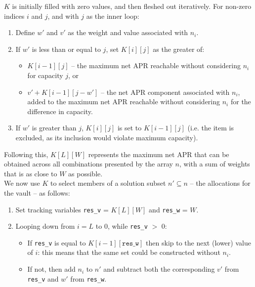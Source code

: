\documentclass{article}
\begin{document}
\noindent
$K$ is initially filled with zero values, and then fleshed out iteratively. For non-zero indices $i$ and $j$, and with $j$ as the inner loop:

\begin{enumerate}
    \item Define $w'$ and $v'$ as the weight and value associated with $n_i$.
    \item If $w'$ is less than or equal to $j$, set $K[i][j]$ as the greater of:
    \begin{itemize}
        \item $K[i - 1][j]$ -- the maximum net APR reachable without considering $n_i$ for capacity $j$, or
        \item $v' + K[i - 1][j - w']$ -- the net APR component associated with $n_i$, added to the maximum net APR reachable without considering $n_i$ for the difference in capacity.
    \end{itemize}
    \item If $w'$ is greater than $j$, $K[i][j]$ is set to $K[i - 1][j]$ (i.e. the item is excluded, as its inclusion would violate maximum capacity).
\end{enumerate}

\noindent
Following this, $K[L][W]$ represents the maximum net APR that can be obtained across all combinations presented by the array $n$, with a sum of weights that is as close to $W$ as possible.\\

\noindent
We now use $K$ to select members of a solution subset $n' \subseteq n$ -- the allocations for the vault -- as follows:

\begin{enumerate}
    \item Set tracking variables \texttt{res\_v} = $K[L][W]$ and \texttt{res\_w} = $W$.
    \item Looping down from $i = L$ to 0, while \texttt{res\_v} $>$ 0:
    \begin{itemize}
        \item If \texttt{res\_v} is equal to $K[i - 1][\texttt{res\_w}]$ then skip to the next (lower) value of $i$: this means that the same set could be constructed without $n_i$.
        \item If not, then add $n_i$ to $n'$ and subtract both the corresponding $v'$ from  \texttt{res\_v} and $w'$ from \texttt{res\_w}.
    \end{itemize}
\end{enumerate}
\end{document}
